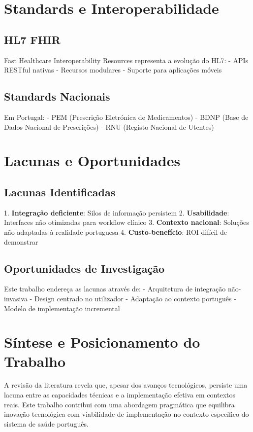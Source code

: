 \section{Standards e Interoperabilidade}

\subsection{HL7 FHIR}

Fast Healthcare Interoperability Resources representa a evolução do HL7:
- APIs RESTful nativas
- Recursos modulares
- Suporte para aplicações móveis


\subsection{Standards Nacionais}

Em Portugal:
- PEM (Prescrição Eletrónica de Medicamentos)
- BDNP (Base de Dados Nacional de Prescrições)
- RNU (Registo Nacional de Utentes)

\section{Lacunas e Oportunidades}

\subsection{Lacunas Identificadas}

1. \textbf{Integração deficiente}: Silos de informação persistem
2. \textbf{Usabilidade}: Interfaces não otimizadas para workflow clínico
3. \textbf{Contexto nacional}: Soluções não adaptadas à realidade portuguesa
4. \textbf{Custo-benefício}: ROI difícil de demonstrar

\subsection{Oportunidades de Investigação}

Este trabalho endereça as lacunas através de:
- Arquitetura de integração não-invasiva
- Design centrado no utilizador
- Adaptação ao contexto português
- Modelo de implementação incremental


\section{Síntese e Posicionamento do Trabalho}


A revisão da literatura revela que, apesar dos avanços tecnológicos, persiste uma lacuna entre as capacidades técnicas e a implementação efetiva em contextos reais. Este trabalho contribui com uma abordagem pragmática que equilibra inovação tecnológica com viabilidade de implementação no contexto específico do sistema de saúde português. 